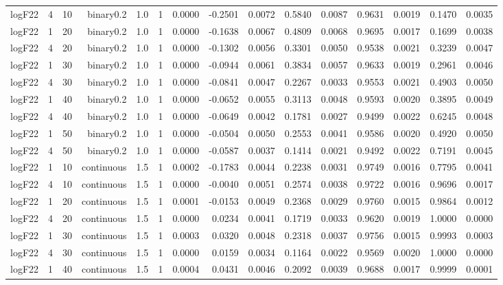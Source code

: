 \begin{longtable}{rrrrrrrrrrrrrrr}
  logF22 & 4 & 10 & binary0.2 & 1.0 & 1 & 0.0000 & -0.2501 & 0.0072 & 0.5840 & 0.0087 & 0.9631 & 0.0019 & 0.1470 & 0.0035 \\ 
  logF22 & 1 & 20 & binary0.2 & 1.0 & 1 & 0.0000 & -0.1638 & 0.0067 & 0.4809 & 0.0068 & 0.9695 & 0.0017 & 0.1699 & 0.0038 \\ 
  logF22 & 4 & 20 & binary0.2 & 1.0 & 1 & 0.0000 & -0.1302 & 0.0056 & 0.3301 & 0.0050 & 0.9538 & 0.0021 & 0.3239 & 0.0047 \\ 
  logF22 & 1 & 30 & binary0.2 & 1.0 & 1 & 0.0000 & -0.0944 & 0.0061 & 0.3834 & 0.0057 & 0.9633 & 0.0019 & 0.2961 & 0.0046 \\ 
  logF22 & 4 & 30 & binary0.2 & 1.0 & 1 & 0.0000 & -0.0841 & 0.0047 & 0.2267 & 0.0033 & 0.9553 & 0.0021 & 0.4903 & 0.0050 \\ 
  logF22 & 1 & 40 & binary0.2 & 1.0 & 1 & 0.0000 & -0.0652 & 0.0055 & 0.3113 & 0.0048 & 0.9593 & 0.0020 & 0.3895 & 0.0049 \\ 
  logF22 & 4 & 40 & binary0.2 & 1.0 & 1 & 0.0000 & -0.0649 & 0.0042 & 0.1781 & 0.0027 & 0.9499 & 0.0022 & 0.6245 & 0.0048 \\ 
  logF22 & 1 & 50 & binary0.2 & 1.0 & 1 & 0.0000 & -0.0504 & 0.0050 & 0.2553 & 0.0041 & 0.9586 & 0.0020 & 0.4920 & 0.0050 \\ 
  logF22 & 4 & 50 & binary0.2 & 1.0 & 1 & 0.0000 & -0.0587 & 0.0037 & 0.1414 & 0.0021 & 0.9492 & 0.0022 & 0.7191 & 0.0045 \\ 
  logF22 & 1 & 10 & continuous & 1.5 & 1 & 0.0002 & -0.1783 & 0.0044 & 0.2238 & 0.0031 & 0.9749 & 0.0016 & 0.7795 & 0.0041 \\ 
  logF22 & 4 & 10 & continuous & 1.5 & 1 & 0.0000 & -0.0040 & 0.0051 & 0.2574 & 0.0038 & 0.9722 & 0.0016 & 0.9696 & 0.0017 \\ 
  logF22 & 1 & 20 & continuous & 1.5 & 1 & 0.0001 & -0.0153 & 0.0049 & 0.2368 & 0.0029 & 0.9760 & 0.0015 & 0.9864 & 0.0012 \\ 
  logF22 & 4 & 20 & continuous & 1.5 & 1 & 0.0000 & 0.0234 & 0.0041 & 0.1719 & 0.0033 & 0.9620 & 0.0019 & 1.0000 & 0.0000 \\ 
  logF22 & 1 & 30 & continuous & 1.5 & 1 & 0.0003 & 0.0320 & 0.0048 & 0.2318 & 0.0037 & 0.9756 & 0.0015 & 0.9993 & 0.0003 \\ 
  logF22 & 4 & 30 & continuous & 1.5 & 1 & 0.0000 & 0.0159 & 0.0034 & 0.1164 & 0.0022 & 0.9569 & 0.0020 & 1.0000 & 0.0000 \\ 
  logF22 & 1 & 40 & continuous & 1.5 & 1 & 0.0004 & 0.0431 & 0.0046 & 0.2092 & 0.0039 & 0.9688 & 0.0017 & 0.9999 & 0.0001 \\ 

\end{longtable}
